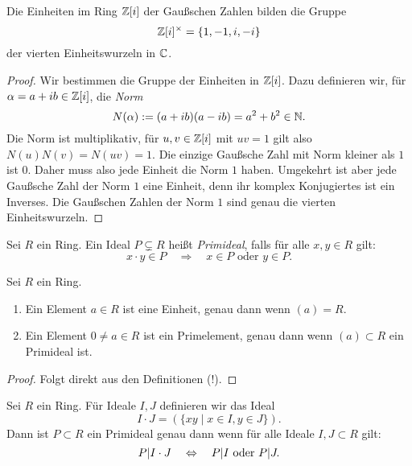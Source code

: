 \documentclass{book}
\begin{document}
\begin{prop}
    \label{prop:gausseinheiten}
    Die Einheiten im Ring $\mathbb{Z}[i]$ der Gaußschen Zahlen bilden die Gruppe
    \[
        \mathbb{Z}[i]^{\times} = \{1, -1, i, -i \}
    \]
    der vierten Einheitswurzeln in $\mathbb{C}$.
\end{prop}
\begin{proof}
    Wir bestimmen die Gruppe der Einheiten in $\mathbb{Z}[i]$. Dazu definieren wir, für $\alpha = a+ib \in \mathbb{Z}[i]$, die \emph{Norm} 
        \[
            N(\alpha) := (a + i b) (a - i b) = a^2 + b^2 \in \mathbb{N}.
        \]
        Die Norm ist multiplikativ, für $u,v \in \mathbb{Z}[i]$ mit $uv = 1$ gilt
        also $N(u)N(v) = N(uv) = 1$. Die einzige Gaußsche Zahl mit Norm
        kleiner als $1$ ist $0$. Daher muss also jede Einheit die Norm $1$
        haben. Umgekehrt ist aber jede Gaußsche Zahl der Norm $1$ eine
        Einheit, denn ihr komplex Konjugiertes ist ein Inverses. Die Gaußschen
        Zahlen der Norm $1$ sind genau die vierten Einheitswurzeln.
\end{proof}

\begin{defi}
    \label{defi:prim}
    Sei $R$ ein Ring. Ein Ideal $P \subsetneq R$ heißt \emph{Primideal}, falls für alle $x,y \in R$ gilt:
    \[
        x \cdot y \in P \quad \Rightarrow \quad \text{$x \in P$ oder $y \in P$}.
    \]
\end{defi}

\begin{prop}
    \label{prop:elementideal}
    Sei $R$ ein Ring.
    \begin{enumerate}
        \item Ein Element $a \in R$ ist eine Einheit, genau dann wenn $(a) = R$. 
        \item Ein Element $0 \neq a \in R$ ist ein Primelement, genau dann wenn $(a)
            \subset R$ ein Primideal ist. 
    \end{enumerate}
\end{prop}
\begin{proof}
    Folgt direkt aus den Definitionen (!).
\end{proof}

\begin{prob}
    \label{prob:prim}
    Sei $R$ ein Ring. Für Ideale $I,J$ definieren wir das Ideal
    \[
        I \cdot J = (\{ xy \; | \; x \in I, y \in J\}).
    \]
    Dann ist $P \subset R$ ein Primideal genau dann wenn für alle Ideale $I,J \subset R$ gilt:
    \[
        P | I \cdot J \quad \Leftrightarrow \quad P | I \text{ oder } P | J.
    \]
\end{prob}
\end{document}
